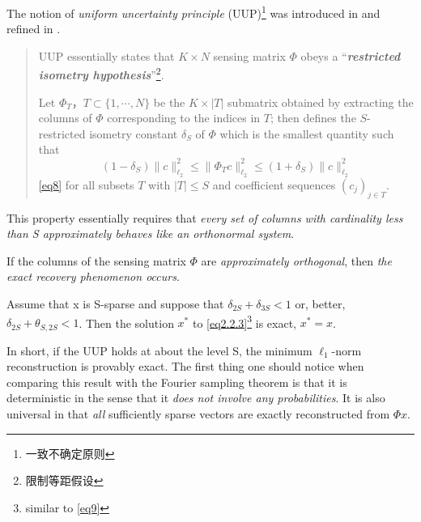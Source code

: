 The notion of \emph{\textcolor[rgb]{1,0,0}{uniform uncertainty principle}} (UUP)\label{UUP}\footnote{一致不确定原则} was introduced in \cite{2-7} and refined in \cite{15}.
\begin{quote}
    UUP essentially states that $K \times N$ sensing matrix $\Phi$ obeys a ``\emph{\textbf{\textcolor[rgb]{1,0,0}{restricted isometry hypothesis}}}''\footnote{限制等距假设}. 

	Let $\Phi_T， T \subset \{1,\cdots,N\}$ be the $K \times \left|T\right|$ submatrix obtained by extracting the columns of $\Phi$ corresponding to the indices in $T$; then \cite{15} defines the $S$-restricted isometry constant $\delta_S$ of $\Phi$ which is the smallest quantity such that
	\begin{equation}
	\label{2.3.2}
	(1-\delta_S)\|c\|_{\ell_2}^2 \leq \|\Phi_Tc\|_{\ell_2}^2 \leq (1+\delta_S)\|c\|_{\ell_2}^2
	\end{equation}\cref{eq8}
	for all subsets $T$ with $\left| T \right| \leq S$ and coefficient sequences $(c_j)_{j \in T}$.
\end{quote}
This property essentially requires that \emph{\textcolor[rgb]{1,0,0}{every set of columns with cardinality less than S approximately behaves like an orthonormal system}}.

 If the columns of the sensing matrix $\Phi$ are \emph{approximately orthogonal}, then \emph{the exact recovery phenomenon occurs}.
 \begin{theorem}\cite{15}
 	\label{th2.3.1}
 	Assume that x is S-sparse and suppose that $\delta_{2S}+\delta_{3S}<1$ or, better, $\delta_{2S}+\theta_{S,2S}<1$. Then the solution $x^*$ to \cref{eq2.2.3}\footnote{similar to \cref{eq9}} is exact, $x^*=x$.
 \end{theorem}
 
 In short, if the UUP holds at about the level S, the minimum $\ell_1$-norm reconstruction is provably exact. The first thing one should notice when comparing this result with the Fourier sampling theorem is that it is deterministic in the sense that it \textcolor[rgb]{1,0,0}{\emph{does not involve any probabilities}}. It is also universal in that \emph{all} sufficiently sparse vectors are exactly reconstructed from $\Phi x$.
 
